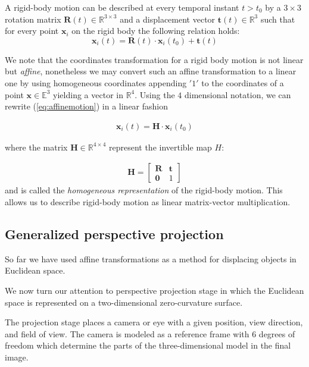 \documentclass[acmtocl,acmnow]{acmtrans2m}
\begin{document}
A rigid-body motion can be described at every temporal instant $t > t_0$ by a $3\times
3$ rotation matrix $\mathbf{R}(t) \in \mathbb{R}^{3\times 3}$ and a displacement
vector $\mathbf{t}(t) \in \mathbb{R}^{3}$ such that for every point $\mathbf{x}_i$ on
the rigid body the following relation holds:
\begin{equation}\label{eq:affinemotion2}
  \mathbf{x}_i(t) = \mathbf{R}(t)\cdot \mathbf{x}_i(t_0) + \mathbf{t}(t)
\end{equation}

We note that the coordinates transformation for a rigid body motion is not
linear but \emph{affine}, nonetheless we may convert such an 
affine transformation to a linear one by using homogeneous coordinates appending
$'1'$ to the coordinates of a point $\mathbf{x} \in \mathbb{E}^3$ yielding
a vector  in $\mathbb{R}^4$. Using the $4$ dimensional notation, we can rewrite (\ref{eq:affinemotion}) in a linear fashion

\begin{align}\label{eq:homogenized}
\mathbf{x}_i(t) = \mathbf{H} \cdot \mathbf{x}_i(t_0)
\end{align}

where the matrix $\mathbf{H}\in \mathbb{R}^{4\times 4}$ represent the invertible map $H$:

\begin{align*}
\mathbf{H} = \begin{bmatrix} \mathbf{R} & \mathbf{t} \\ \mathbf{0} & 1
\end{bmatrix}
\end{align*}
and is called the
\emph{homogeneous representation} of the rigid-body motion. This allows us to describe rigid-body motion as linear matrix-vector multiplication.

\subsection{Generalized perspective projection}
So far we have used affine transformations as a method for displacing objects in Euclidean space.

We now turn our attention to perspective projection stage in which the Euclidean space is represented on a two-dimensional zero-curvature surface.

The projection stage places a camera or eye with a given position, view direction, and field of view.
The camera is modeled as a reference frame with 6 degrees of freedom which determine the parts of the three-dimensional model in the final image.
\end{document}
